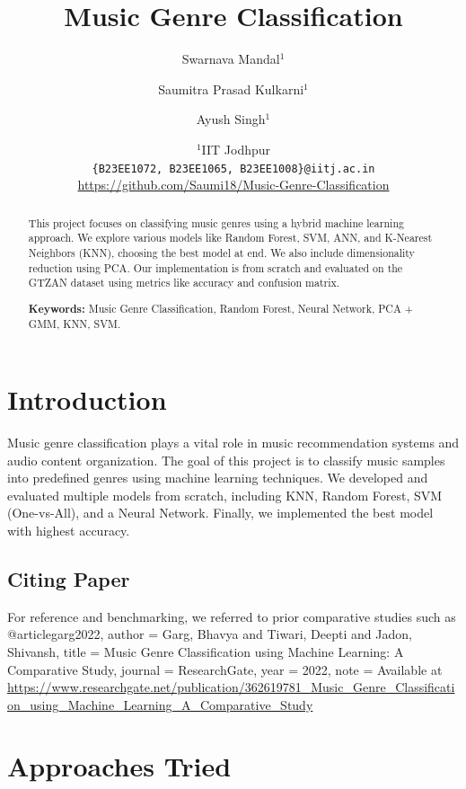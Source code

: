 \documentclass[a4paper]{article}
\title{Music Genre Classification}
\author{Swarnava Mandal$^1$ \and Saumitra Prasad Kulkarni$^1$ \and Ayush Singh$^1$}
\date{
	$^1$IIT Jodhpur \\ \texttt{\{B23EE1072, B23EE1065, B23EE1008\}@iitj.ac.in} \\[2ex]
	\url{https://github.com/Saumi18/Music-Genre-Classification}
}
\theoremstyle{plain}
\theoremstyle{definition}
\begin{document}
\maketitle

\begin{abstract}
This project focuses on classifying music genres using a hybrid machine learning approach. We explore various models like Random Forest, SVM, ANN, and K-Nearest Neighbors (KNN), choosing the best model at end. We also include dimensionality reduction using PCA. Our implementation is from scratch and evaluated on the GTZAN dataset using metrics like accuracy and confusion matrix.
\vspace{1cm}

\noindent\textbf{Keywords:} Music Genre Classification, Random Forest, Neural Network, PCA + GMM, KNN, SVM.
\end{abstract}

\tableofcontents

\section{Introduction}
\label{sec:intro}
Music genre classification plays a vital role in music recommendation systems and audio content organization. The goal of this project is to classify music samples into predefined genres using machine learning techniques. We developed and evaluated multiple models from scratch, including KNN, Random Forest, SVM (One-vs-All), and a Neural Network. Finally, we implemented the best model with highest accuracy.
\subsection{Citing Paper}
For reference and benchmarking, we referred to prior comparative studies such as @article{garg2022,
  author    = {Garg, Bhavya and Tiwari, Deepti and Jadon, Shivansh},
  title     = {Music Genre Classification using Machine Learning: A Comparative Study},
  journal   = {ResearchGate},
  year      = {2022},
  note      = {Available at \url{https://www.researchgate.net/publication/362619781_Music_Genre_Classification_using_Machine_Learning_A_Comparative_Study}}
}




\section{Approaches Tried}
\label{sec:app}
\end{document}
